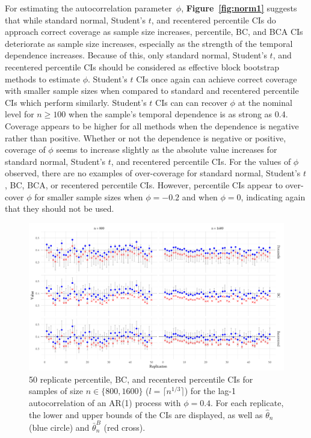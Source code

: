\documentclass[10pt]{article}
\begin{document}
For estimating the autocorrelation parameter~$\phi$, 
\textbf{Figure~\ref{fig:norm1}} suggests that while standard normal, Student's $t$, and 
recentered percentile CIs do approach correct coverage as sample size increases, 
percentile, BC, and BCA CIs deteriorate as sample size increases, especially as 
the strength of the temporal dependence increases. Because of this, only 
standard normal, Student's $t$, and recentered percentile CIs should be considered as 
effective block bootstrap methods to estimate $\phi$. Student's $t$ CIs once 
again can achieve correct coverage with smaller sample sizes when compared to 
standard and recentered percentile CIs which perform similarly. Student's $t$ 
CIs can can recover $\phi$ at the nominal level for $n \geq 100$ when the 
sample's temporal dependence is as strong as 0.4. Coverage appears to be higher 
for all methods when the dependence is negative rather than positive. Whether or 
not the dependence is negative or positive, coverage of $\phi$ seems to increase 
slightly as the absolute value increases for standard normal, Student's $t$, and 
recentered percentile CIs. For the values of $\phi$ observed, there are no 
examples of over-coverage for standard normal, Student's $t$, BC, BCA, or recentered 
percentile CIs. However, percentile CIs appear to over-cover $\phi$ for smaller 
sample sizes when $\phi = -0.2$ and when $\phi = 0$, indicating again that they 
should not be used.


\begin{figure}[tbp]
  \centering
  \includegraphics[width=\textwidth]{figures/norm_phi_intervals}
  \caption{50 replicate percentile, BC, and recentered percentile CIs for 
    samples of size $n \in \{800, 1600\}$ ($l = \lceil n^{1/3} \rceil$)
    for the lag-1 autocorrelation of an AR(1) process with $\phi = 0.4$. For 
    each replicate, the lower and upper bounds of the CIs are displayed, as well 
    as $\hat\theta_n$ (blue circle) and $\bar\theta_n^{B}$ (red cross).}
  \label{fig:npi}
\end{figure}
\end{document}
